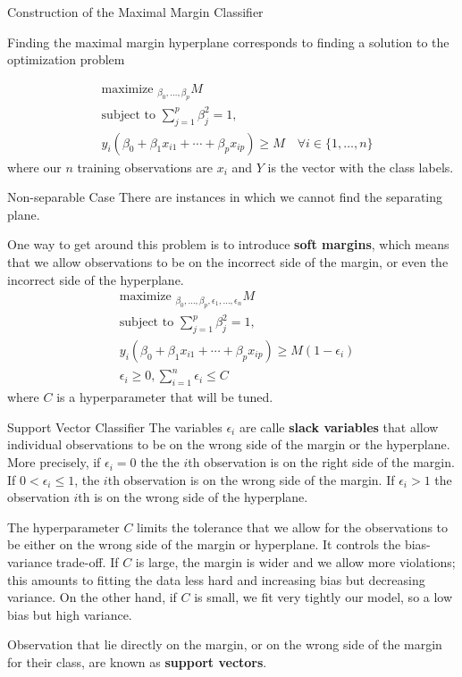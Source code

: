 \documentclass{beamer}
\begin{document}
\begin{frame}{Construction of the Maximal Margin Classifier}
	
	Finding the maximal margin hyperplane corresponds to finding a solution to the optimization problem
	
	\begin{equation*}
		\begin{split}
			&\textrm{maximize }_{\beta_0,\ldots, \beta_p} M \\
			&\textrm{subject to } \sum_{j=1}^p \beta_j^2 =1 , \\
			& y_i (\beta_0 + \beta_1 x_{i1}+ \cdots + \beta_p x_{ip} )\ge M \quad \forall i \in \{1,\ldots,n\}
		\end{split}
	\end{equation*}
where our $n$ training observations are $x_{i}$ and $Y$ is the vector with the class labels. 
\end{frame}

\begin{frame}{Non-separable Case}
	There are instances in which we cannot find the separating plane.
	
	One way to get around this problem is to introduce {\bf soft margins}, which means that we allow observations to be on the incorrect side of the margin, or even the incorrect side of the hyperplane. 
	\begin{equation*}
		\begin{split}
			&\textrm{maximize }_{\beta_0,\ldots, \beta_p,\epsilon_1,\ldots,\epsilon_n} M \\
			&\textrm{subject to } \sum_{j=1}^p \beta_j^2 =1 , \\
			& y_i (\beta_0 + \beta_1 x_{i1}+ \cdots + \beta_p x_{ip} )\ge M (1-\epsilon_i) \\
			& \epsilon_i \ge 0, \sum_{i=1}^n \epsilon_i \le C 
		\end{split}
	\end{equation*}
	where $C$ is a hyperparameter that will be tuned.
	
	 
\end{frame}
\begin{frame}{Support Vector Classifier}
The variables $\epsilon_i$ are calle {\bf slack variables} that allow individual observations to be on the wrong side of the margin or the hyperplane. More precisely, if $\epsilon_i=0$ the the $i$th observation is on the right side of the margin. If $0< \epsilon_i \le 1$, the $i$th observation is on the wrong side of the margin. If $\epsilon_i>1$ the observation $i$th is on the wrong side of the hyperplane. 

The hyperparameter $C$ limits the tolerance that we allow for the observations to be either on the wrong side of the margin or hyperplane. It controls the bias-variance trade-off. If $C$ is large, the margin is wider and we allow more violations; this amounts to fitting the data less hard and increasing bias but decreasing variance. On the other hand, if $C$ is small, we fit very tightly our model, so a low bias but high variance. 


Observation that lie directly on the margin, or on the wrong side of the margin for their class, are known as {\bf support vectors}.
\end{frame}
\end{document}
